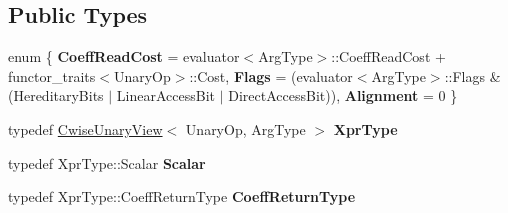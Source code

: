 \subsection*{Public Types}
\begin{DoxyCompactItemize}
\item 
\mbox{\label{struct_eigen_1_1internal_1_1unary__evaluator_3_01_cwise_unary_view_3_01_unary_op_00_01_arg_type_01_4_00_01_index_based_01_4_abd82b80b11c65a506c82a4f83478f877}} 
enum \{ {\bfseries Coeff\+Read\+Cost} = evaluator$<$Arg\+Type$>$\+::Coeff\+Read\+Cost + functor\+\_\+traits$<$Unary\+Op$>$\+::Cost, 
{\bfseries Flags} = (evaluator$<$Arg\+Type$>$\+::Flags \& (Hereditary\+Bits $\vert$ Linear\+Access\+Bit $\vert$ Direct\+Access\+Bit)), 
{\bfseries Alignment} = 0
 \}
\item 
\mbox{\label{struct_eigen_1_1internal_1_1unary__evaluator_3_01_cwise_unary_view_3_01_unary_op_00_01_arg_type_01_4_00_01_index_based_01_4_ae5cfa2afd101a0b7edca578124f21dc9}} 
typedef \mbox{\hyperlink{class_eigen_1_1_cwise_unary_view}{Cwise\+Unary\+View}}$<$ Unary\+Op, Arg\+Type $>$ {\bfseries Xpr\+Type}
\item 
\mbox{\label{struct_eigen_1_1internal_1_1unary__evaluator_3_01_cwise_unary_view_3_01_unary_op_00_01_arg_type_01_4_00_01_index_based_01_4_aaa618f8ab4054698507a28e7bd389c24}} 
typedef Xpr\+Type\+::\+Scalar {\bfseries Scalar}
\item 
\mbox{\label{struct_eigen_1_1internal_1_1unary__evaluator_3_01_cwise_unary_view_3_01_unary_op_00_01_arg_type_01_4_00_01_index_based_01_4_ad73fe5f8d67ef00b16cb2a465741bd89}} 
typedef Xpr\+Type\+::\+Coeff\+Return\+Type {\bfseries Coeff\+Return\+Type}
\end{DoxyCompactItemize}
